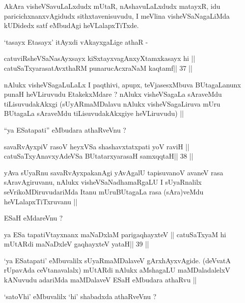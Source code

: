 \begin{artha}
AkAra visheVSavuLaLxdudx mUtaR, nAshavuLaLxdudx matayxR, idu
paricichxnanxvAgidudx sithxtavenisuvudu, I meVlina visheVSaNagaLiMda
kUDidedx satf eMbudAgi heVLalapxTiTxde.

`tasayx Etasayx' itAyxdi vAkayxgaLige athaR -
\end{artha}

\begin{shl}
\footnotemark[1]catuviRsheVSaNasAyxsayx kiSxtayxvagAnxyXtamxkasayx hi ||
\footnotemark[1]catuSaTxyarasatAvxthaRM punarucAcxraNaM kaqtamf\hfill || 37 ||
\end{shl}

\begin{artha}
nAlukx visheVSagaLuLaLx I paqthivi, apupx, teVjasesxMbuva BUtagaLanunx
punaH heVLiruvudu EtakekxMdare ? nAlukx visheVSagaLa sAraveMdu
tiLisuvudakAkxgi  (sUyARmaMDalavu nAlukx visheVSagaLiruva mUru
BUtagaLa sAraveMdu tiLisuvudakAkxgiye heVLiruvudu) ||

``ya ESatapati'' eMbudara athaRveVnu ?
\end{artha}

\begin{shl}
savaRvAyxpiV rasoV heyxVSa shashavxtatxpati yoV raviH ||
\footnotemark[1]catuSaTxyAnavxyAdeVSa BUtatarxyarasaH samxqqtaH\hfill || 38 ||
\end{shl}

\begin{artha}
yAva sUyaRnu savaRvAyxpakanAgi yAvAgalU tapisuvanoV avaneV rasa
sAravAgiruvanu, nAlukx visheVSaNadhamaRgaLU I sUyaRnalilx
seVrikoMDiruvudariMda Itanu mUruBUtagaLa rasa (sAra)veMdu
heVLalapxTiTxruvanu ||

ESaH eMdareVnu ?
\end{artha}

\begin{shl}
ya ESa tapatiVtayxnanx maNaDxlaM parigaqhayxteV ||
catuSaTxyaM hi mUtARdi maNaDxleV gaqhayxteV yataH\hfill || 39 ||
\end{shl}

\begin{artha}
`ya ESatapati' eMbuvalilx sUyaRmaMDalaveV gArxhAyxvAgide. (deVvatA
rUpavAda ceVtanavalalx) mUtARdi nAlukx aMshagaLU maMDaladalelxV
kANuvudu adariMda maMDalaveV ESaH eMbudara athaRvu ||

`satoVhi' eMbuvalilx `hi' shabadxda athaRveVnu ?
\end{artha}

